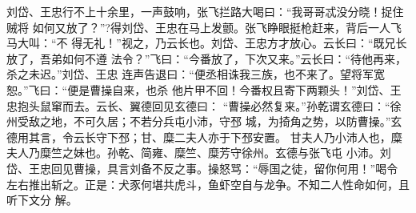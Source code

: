 刘岱、王忠行不上十余里，一声鼓响，张飞拦路大喝曰：“我哥哥忒没分晓！捉住贼将
如何又放了？”?得刘岱、王忠在马上发颤。张飞睁眼挺枪赶来，背后一人飞马大叫：“不
得无礼！”视之，乃云长也。刘岱、王忠方才放心。云长曰：“既兄长放了，吾弟如何不遵
法令？”飞曰：“今番放了，下次又来。”云长曰：“待他再来，杀之未迟。”刘岱、王忠
连声告退曰：“便丞相诛我三族，也不来了。望将军宽恕。”飞曰：“便是曹操自来，也杀
他片甲不回！今番权且寄下两颗头！”刘岱、王忠抱头鼠窜而去。云长、翼德回见玄德曰：
“曹操必然复来。”孙乾谓玄德曰：“徐州受敌之地，不可久居；不若分兵屯小沛，守邳
城，为掎角之势，以防曹操。”玄德用其言，令云长守下邳；甘、糜二夫人亦于下邳安置。
甘夫人乃小沛人也，糜夫人乃糜竺之妹也。孙乾、简雍、糜竺、糜芳守徐州。玄德与张飞屯
小沛。刘岱、王忠回见曹操，具言刘备不反之事。操怒骂：“辱国之徒，留你何用！”喝令
左右推出斩之。正是：犬豕何堪共虎斗，鱼虾空自与龙争。不知二人性命如何，且听下文分
解。